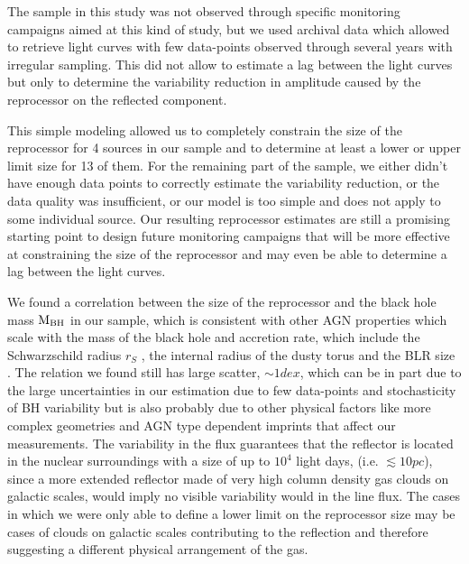 The sample in this study was not observed through specific monitoring campaigns aimed at this kind of study, but we used archival data which allowed to retrieve light curves with few data-points observed through several years with irregular sampling. This did not allow to estimate a lag between the light curves but only to determine the variability reduction in amplitude caused by the reprocessor on the reflected component.

This simple modeling allowed us to completely constrain the size of the reprocessor for 4 sources in our sample and to determine at least a lower or upper limit size for 13 of them. For the remaining part of the sample, we either didn't have enough data points to correctly estimate the variability reduction, or the data quality was insufficient, or our model is too simple and does not apply to some individual source. Our resulting reprocessor estimates are still a promising starting point to design future monitoring campaigns that will be more effective at constraining the size of the reprocessor and may even be able to determine a lag between the light curves.

We found a correlation between the size of the reprocessor and the black hole mass ${\rm M}_{\rm BH}$ in our sample, which is consistent with other AGN properties which scale with the mass of the black hole and accretion rate, which include the Schwarzschild radius $r_S$ \citep{1916AbhKP1916..189S}, the internal radius of the dusty torus \citep{2014ApJ...788..159K} and the BLR size \citep{2020MNRAS.491.5881Y}. The relation we found still has large scatter, $\sim1 dex$, which can be in part due to the large uncertainties in our estimation due to few data-points and stochasticity of BH variability but is also probably due to other physical factors like more complex geometries and AGN type dependent imprints that affect our measurements. The variability in the \kalfa{} flux guarantees that the reflector is located in the nuclear surroundings with a size of up to $10^4$ light days, (i.e. $\lesssim10 pc$), since a more extended reflector made of very high column density gas clouds on galactic scales, would imply no visible variability would in the \kalfa{} line flux. The cases in which we were only able to define a lower limit on the reprocessor size may be cases of clouds on galactic scales contributing to the reflection and therefore suggesting a different physical arrangement of the gas.

